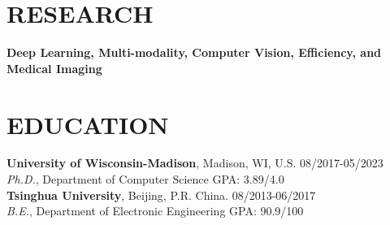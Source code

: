 \documentclass[margin]{res}
\begin{document}
\begin{resume}
\vspace{-2em}
\section{RESEARCH}
                \textbf{Deep Learning, Multi-modality, Computer Vision, Efficiency, and Medical Imaging}
                
\vspace{-1em}
\section{EDUCATION} 
                {\bf University of Wisconsin-Madison}, Madison, WI, U.S. \hfill 08/2017-05/2023\\
                {\sl {Ph.D.}}, Department of Computer Science \hfill GPA: 3.89/4.0\\
                {\bf Tsinghua University}, Beijing, P.R. China. \hfill 08/2013-06/2017\\
                {\sl {B.E.}}, Department of Electronic Engineering \hfill GPA: 90.9/100


\end{resume}
\end{document}
